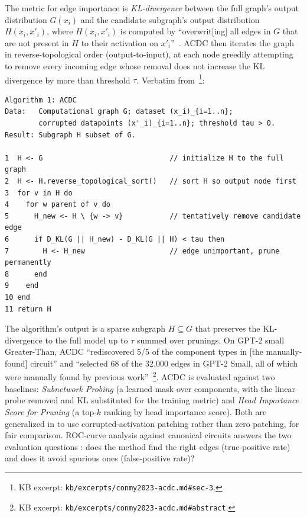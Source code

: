 The metric for edge importance is \emph{KL-divergence} between the full
graph's output distribution $G(x_i)$ and the candidate subgraph's
output distribution $H(x_i, x'_i)$, where $H(x_i, x'_i)$ is computed by
``overwrit[ing] all edges in $G$ that are not present in $H$ to their
activation on $x'_i$''~\citep[\S 3]{conmy2023-acdc}. ACDC then iterates
the graph in reverse-topological order (output-to-input), at each node
greedily attempting to remove every incoming edge whose removal does
not increase the KL divergence by more than threshold $\tau$. Verbatim
from~\citet[Algorithm 1]{conmy2023-acdc}\footnote{KB excerpt:
\texttt{kb/excerpts/conmy2023-acdc.md\#sec-3}.}:

\begin{lstlisting}[caption={ACDC, the Automatic Circuit DisCovery algorithm.},label={lst:acdc}]
Algorithm 1: ACDC
Data:   Computational graph G; dataset (x_i)_{i=1..n};
        corrupted datapoints (x'_i)_{i=1..n}; threshold tau > 0.
Result: Subgraph H subset of G.

1  H <- G                              // initialize H to the full graph
2  H <- H.reverse_topological_sort()   // sort H so output node first
3  for v in H do
4    for w parent of v do
5      H_new <- H \ {w -> v}           // tentatively remove candidate edge
6      if D_KL(G || H_new) - D_KL(G || H) < tau then
7        H <- H_new                    // edge unimportant, prune permanently
8      end
9    end
10 end
11 return H
\end{lstlisting}

The algorithm's output is a sparse subgraph $H \subseteq G$ that
preserves the KL-divergence to the full model up to $\tau$ summed over
prunings. On GPT-2 small Greater-Than, ACDC ``rediscovered 5/5 of the
component types in [the manually-found] circuit'' and ``selected 68 of
the 32{,}000 edges in GPT-2 Small, all of which were manually found by
previous work''~\citep[Abstract]{conmy2023-acdc}\footnote{KB excerpt:
\texttt{kb/excerpts/conmy2023-acdc.md\#abstract}.}. ACDC is evaluated
against two baselines: \emph{Subnetwork Probing} (a learned mask over
components, with the linear probe removed and KL substituted for the
training metric) and \emph{Head Importance Score for Pruning} (a
top-$k$ ranking by head importance score). Both are generalized in
\citet{conmy2023-acdc} to use corrupted-activation patching rather
than zero patching, for fair comparison. ROC-curve analysis against
canonical circuits answers the two evaluation questions
\citep[\S 4]{conmy2023-acdc}: does the method find the right edges
(true-positive rate) and does it avoid spurious ones (false-positive
rate)?

